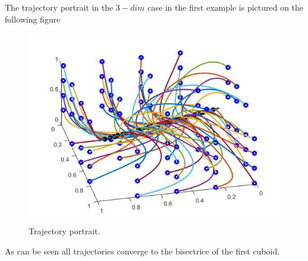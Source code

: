 \documentclass[a4paper,10pt, english]{article}
\begin{document}
The trajectory portrait in the $3-dim$ case in the first example is pictured on the following figure
\begin{figure}[ht]
\label{fig_c4}
\centering
\includegraphics[scale= 0.4]{5.jpg}
\caption{Trajectory portrait.}
\end{figure}
As can be seen all trajectories converge to the bisectrice of the first cuboid.
\end{document}
